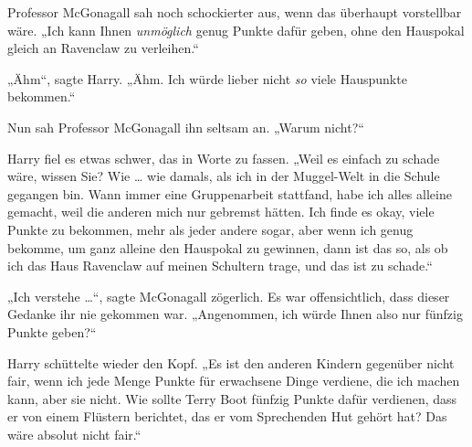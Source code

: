 Professor McGonagall sah noch schockierter aus, wenn das überhaupt vorstellbar wäre.
„Ich kann Ihnen \emph{unmöglich} genug Punkte dafür geben, ohne den Hauspokal gleich an Ravenclaw zu verleihen.“

„Ähm“, sagte Harry. „Ähm. Ich würde lieber nicht \emph{so} viele Hauspunkte bekommen.“

Nun sah Professor McGonagall ihn seltsam an.
„Warum nicht?“

Harry fiel es etwas schwer, das in Worte zu fassen.
„Weil es einfach zu schade wäre, wissen Sie? Wie … wie damals, als ich in der Muggel-Welt in die Schule gegangen bin. Wann immer eine Gruppenarbeit stattfand, habe ich alles alleine gemacht, weil die anderen mich nur gebremst hätten. Ich finde es okay, viele Punkte zu bekommen, mehr als jeder andere sogar, aber wenn ich genug bekomme, um ganz alleine den Hauspokal zu gewinnen, dann ist das so, als ob ich das Haus Ravenclaw auf meinen Schultern trage, und das ist zu schade.“

„Ich verstehe …“, sagte McGonagall zögerlich. Es war offensichtlich, dass dieser Gedanke ihr nie gekommen war.
„Angenommen, ich würde Ihnen also nur fünfzig Punkte geben?“

Harry schüttelte wieder den Kopf.
„Es ist den anderen Kindern gegenüber nicht fair, wenn ich jede Menge Punkte für erwachsene Dinge verdiene, die ich machen kann, aber sie nicht. Wie sollte Terry Boot fünfzig Punkte dafür verdienen, dass er von einem Flüstern berichtet, das er vom Sprechenden Hut gehört hat? Das wäre absolut nicht fair.“

